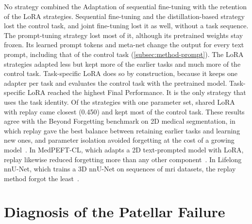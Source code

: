 
No strategy combined the Adaptation of sequential fine-tuning with the retention of the LoRA strategies.
Sequential fine-tuning and the distillation-based strategy lost the control task, and joint fine-tuning lost it as well, without a task sequence.
The prompt-tuning strategy lost most of it, although its pretrained weights stay frozen.
Its learned prompt tokens and meta-net change the output for every text prompt, including that of the control task (\cref{subsec:method-prompt}).
The LoRA strategies adapted less but kept more of the earlier tasks and much more of the control task.
Task-specific LoRA does so by construction, because it keeps one adapter per task and evaluates the control task with the pretrained model.
Task-specific LoRA reached the highest Final Performance.
It is the only strategy that uses the task identity.
Of the strategies with one parameter set, shared LoRA with replay came closest (0.450) and kept most of the control task.
These results agree with the Beyond Forgetting benchmark on 2D medical segmentation, in which replay gave the best balance between retaining earlier tasks and learning new ones, and parameter isolation avoided forgetting at the cost of a growing model~\cite[Sec.~5]{wang2026beyondforgetting}.
In MedPEFT-CL, which adapts a 2D text-prompted model with LoRA, replay likewise reduced forgetting more than any other component~\cite[Table~8]{gao2026medpeftcl}.
In Lifelong nnU-Net, which trains a 3D nnU-Net on sequences of \gls{mri} datasets, the replay method forgot the least~\cite{gonzalez2023lifelong}.

\section{Diagnosis of the Patellar Failure}
\label{sec:exp-patellar}

